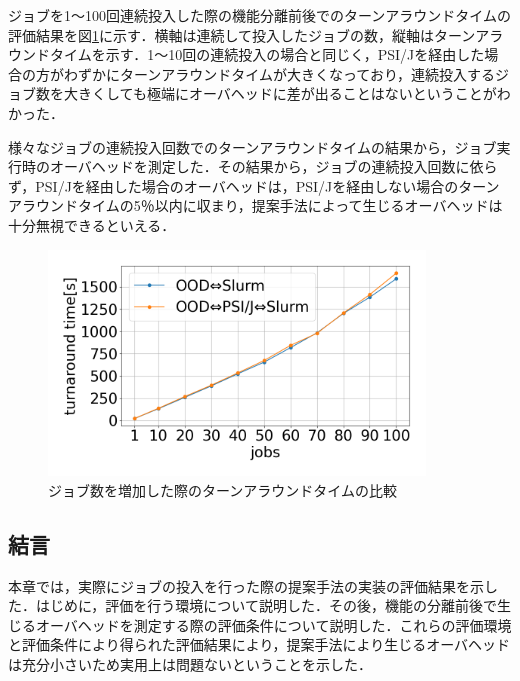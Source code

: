 ジョブを1～100回連続投入した際の機能分離前後でのターンアラウンドタイムの評価結果を図\ref{fig10}に示す．横軸は連続して投入したジョブの数，縦軸はターンアラウンドタイムを示す．1～10回の連続投入の場合と同じく，PSI/Jを経由した場合の方がわずかにターンアラウンドタイムが大きくなっており，連続投入するジョブ数を大きくしても極端にオーバヘッドに差が出ることはないということがわかった．\par
様々なジョブの連続投入回数でのターンアラウンドタイムの結果から，ジョブ実行時のオーバヘッドを測定した．その結果から，ジョブの連続投入回数に依らず，PSI/Jを経由した場合のオーバヘッドは，PSI/Jを経由しない場合のターンアラウンドタイムの5％以内に収まり，提案手法によって生じるオーバヘッドは十分無視できるといえる．\par

\begin{figure}[tb]
    \centering
    \includegraphics[width=100mm]{./fig/100jobs.png}
    \caption{ジョブ数を増加した際のターンアラウンドタイムの比較}
    \label{fig10}
\end{figure}

\subsection{結言}
本章では，実際にジョブの投入を行った際の提案手法の実装の評価結果を示した．はじめに，評価を行う環境について説明した．その後，機能の分離前後で生じるオーバヘッドを測定する際の評価条件について説明した．これらの評価環境と評価条件により得られた評価結果により，提案手法により生じるオーバヘッドは充分小さいため実用上は問題ないということを示した．\par